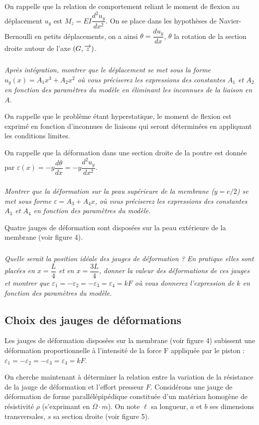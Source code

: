 \documentclass[10pt,fleqn]{article} %
\begin{document}
On rappelle que la relation de comportement reliant le moment de flexion au déplacement $u_y$
est $M_z = EI \dfrac{d^2 u_y}{d x^2}$. On se place dans les hypothèses de Navier-Bernoulli en petits déplacements,
on a ainsi $\theta = \dfrac{du_y}{dx}$, $\theta$ la rotation de la section droite autour de l'axe $(G,\overrightarrow{z})$. 



\subparagraph{}
\textit{Après intégration, montrer que le déplacement se met sous la forme $u_y(x) = A_1x^3 + A_2x^2$
où vous préciserez les expressions des constantes $A_1$ et $A_2$ en fonction des paramètres du modèle
en éliminant les inconnues de la liaison en $A$.}

On rappelle que le problème étant hyperstatique, le moment de flexion est exprimé en fonction
d'inconnues de liaisons qui seront déterminées en appliquant les conditions limites.

On rappelle que la déformation dans une section droite de la poutre est donnée par 
$\varepsilon(x) = -y \dfrac{d\theta}{ d x}=-y\dfrac{d^2 u_y} {dx^2}$.

\subparagraph{}
\textit{Montrer que la déformation sur la peau supérieure de la membrane ($y = e/2$) se met sous
forme $\varepsilon = A_3 +A_4x$, où vous préciserez les expressions des constantes $A_3$ et $A_4$ en fonction des
paramètres du modèle.}

Quatre jauges de déformation sont disposées sur la peau extérieure de la membrane (voir
figure 4).


\subparagraph{}

\textit{Quelle serait la position idéale des jauges de déformation ? En pratique elles sont placées
en $x = \dfrac{L}{4}$ et en $x = \dfrac{3L}{4}$, donner la valeur des déformations de ces jauges et montrer que
$\varepsilon_1 = -\varepsilon_2 = -\varepsilon_3 = \varepsilon_4 = kF$ 
où vous donnerez l'expression de $k$ 
en fonction des paramètres du modèle.}

\subsection{Choix des jauges de déformations}


Les jauges de déformation disposées sur la membrane (voir figure 4) subissent une déformation
proportionnelle à l'intensité de la force F appliquée par le piston :
$\varepsilon_1 = -\varepsilon_2 = -\varepsilon_3 = \varepsilon_4 = kF$.

On cherche maintenant à déterminer la relation entre la variation de la résistance de la jauge
de déformation et l'effort presseur $F$.
Considérons une jauge de déformation de forme parallélépipédique constituée d'un matériau
homogène de résistivité $\rho$ (s'exprimant en $\Omega\cdot m$). On note $\ell$ sa longueur, $a$ et $b$ ses dimensions
transversales, $s$ sa section droite (voir figure 5).
\end{document}
